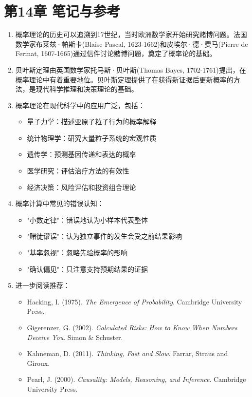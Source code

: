 \section*{第14章 笔记与参考}

\begin{enumerate}
\item 概率理论的历史可以追溯到17世纪，当时欧洲数学家开始研究赌博问题。法国数学家布莱兹·帕斯卡(Blaise Pascal, 1623-1662)和皮埃尔·德·费马(Pierre de Fermat, 1607-1665)通过信件讨论赌博问题，奠定了概率论的基础。

\item 贝叶斯定理由英国数学家托马斯·贝叶斯(Thomas Bayes, 1702-1761)提出，在概率理论中有着重要地位。贝叶斯定理提供了在获得新证据后更新概率的方法，是现代科学推理和决策理论的基础。

\item 概率理论在现代科学中的应用广泛，包括：
   \begin{itemize}
   \item 量子力学：描述亚原子粒子行为的概率解释
   \item 统计物理学：研究大量粒子系统的宏观性质
   \item 遗传学：预测基因传递和表达的概率
   \item 医学研究：评估治疗方法的有效性
   \item 经济决策：风险评估和投资组合理论
   \end{itemize}

\item 概率计算中常见的错误认知：
   \begin{itemize}
   \item "小数定律"：错误地认为小样本代表整体
   \item "赌徒谬误"：认为独立事件的发生会受之前结果影响
   \item "基率忽视"：忽略先验概率的影响
   \item "确认偏见"：只注意支持预期结果的证据
   \end{itemize}

\item 进一步阅读推荐：
   \begin{itemize}
   \item Hacking, I. (1975). \textit{The Emergence of Probability}. Cambridge University Press.
   \item Gigerenzer, G. (2002). \textit{Calculated Risks: How to Know When Numbers Deceive You}. Simon \& Schuster.
   \item Kahneman, D. (2011). \textit{Thinking, Fast and Slow}. Farrar, Straus and Giroux.
   \item Pearl, J. (2000). \textit{Causality: Models, Reasoning, and Inference}. Cambridge University Press.
   \end{itemize}
\end{enumerate}


